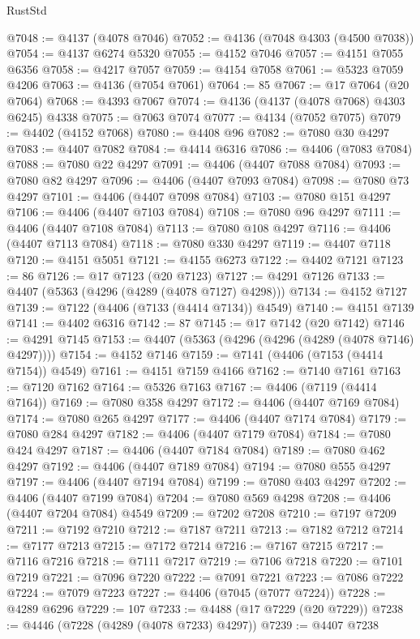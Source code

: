 \begin{lexlean}{RustStd}
\begin{coremodule}
@7048 := @4137 (@4078 @7046)
@7052 := @4136 (@7048 @4303 (@4500 @7038))
@7054 := @4137 @6274 @5320
@7055 := @4152 @7046
@7057 := @4151 @7055 @6356
@7058 := @4217 @7057
@7059 := @4154 @7058
@7061 := @5323 @7059 @4206
@7063 := @4136 (@7054 @7061)
@7064 := 85
@7067 := @17 @7064 (@20 @7064)
@7068 := @4393 @7067
@7074 := @4136 (@4137 (@4078 @7068) @4303 @6245) @4338
@7075 := @7063 @7074
@7077 := @4134 (@7052 @7075)
@7079 := @4402 (@4152 @7068)
@7080 := @4408 @96
@7082 := @7080 @30 @4297
@7083 := @4407 @7082
@7084 := @4414 @6316
@7086 := @4406 (@7083 @7084)
@7088 := @7080 @22 @4297
@7091 := @4406 (@4407 @7088 @7084)
@7093 := @7080 @82 @4297
@7096 := @4406 (@4407 @7093 @7084)
@7098 := @7080 @73 @4297
@7101 := @4406 (@4407 @7098 @7084)
@7103 := @7080 @151 @4297
@7106 := @4406 (@4407 @7103 @7084)
@7108 := @7080 @96 @4297
@7111 := @4406 (@4407 @7108 @7084)
@7113 := @7080 @108 @4297
@7116 := @4406 (@4407 @7113 @7084)
@7118 := @7080 @330 @4297
@7119 := @4407 @7118
@7120 := @4151 @5051
@7121 := @4155 @6273
@7122 := @4402 @7121
@7123 := 86
@7126 := @17 @7123 (@20 @7123)
@7127 := @4291 @7126
@7133 := @4407 (@5363 (@4296 (@4289 (@4078 @7127) @4298)))
@7134 := @4152 @7127
@7139 := @7122 (@4406 (@7133 (@4414 @7134)) @4549)
@7140 := @4151 @7139
@7141 := @4402 @6316
@7142 := 87
@7145 := @17 @7142 (@20 @7142)
@7146 := @4291 @7145
@7153 := @4407 (@5363 (@4296 (@4296 (@4289 (@4078 @7146) @4297))))
@7154 := @4152 @7146
@7159 := @7141 (@4406 (@7153 (@4414 @7154)) @4549)
@7161 := @4151 @7159 @4166
@7162 := @7140 @7161
@7163 := @7120 @7162
@7164 := @5326 @7163
@7167 := @4406 (@7119 (@4414 @7164))
@7169 := @7080 @358 @4297
@7172 := @4406 (@4407 @7169 @7084)
@7174 := @7080 @265 @4297
@7177 := @4406 (@4407 @7174 @7084)
@7179 := @7080 @284 @4297
@7182 := @4406 (@4407 @7179 @7084)
@7184 := @7080 @424 @4297
@7187 := @4406 (@4407 @7184 @7084)
@7189 := @7080 @462 @4297
@7192 := @4406 (@4407 @7189 @7084)
@7194 := @7080 @555 @4297
@7197 := @4406 (@4407 @7194 @7084)
@7199 := @7080 @403 @4297
@7202 := @4406 (@4407 @7199 @7084)
@7204 := @7080 @569 @4298
@7208 := @4406 (@4407 @7204 @7084) @4549
@7209 := @7202 @7208
@7210 := @7197 @7209
@7211 := @7192 @7210
@7212 := @7187 @7211
@7213 := @7182 @7212
@7214 := @7177 @7213
@7215 := @7172 @7214
@7216 := @7167 @7215
@7217 := @7116 @7216
@7218 := @7111 @7217
@7219 := @7106 @7218
@7220 := @7101 @7219
@7221 := @7096 @7220
@7222 := @7091 @7221
@7223 := @7086 @7222
@7224 := @7079 @7223
@7227 := @4406 (@7045 (@7077 @7224))
@7228 := @4289 @6296
@7229 := 107
@7233 := @4488 (@17 @7229 (@20 @7229))
@7238 := @4446 (@7228 (@4289 (@4078 @7233) @4297))
@7239 := @4407 @7238

\end{coremodule}
\end{lexlean}

